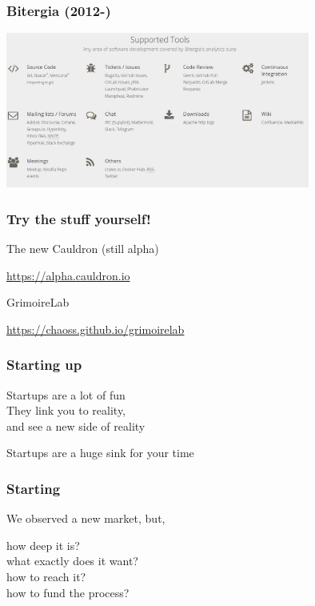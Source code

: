 \documentclass[17pt,aspectratio=169,hyperref=pdfusetitle]{beamer}
\begin{document}
\begin{frame}[fragile]
  \frametitle{Bitergia (2012-)}

  \begin{center}
  \includegraphics[width=10cm]{figs/bitergia-tools}
  \end{center}  
  
\end{frame}

\begin{frame}[fragile]
  \frametitle{Try the stuff yourself!}

  The new Cauldron (still alpha)

  \begin{flushright}
    \url{https://alpha.cauldron.io}
  \end{flushright}

  GrimoireLab

  \begin{flushright}
    \url{https://chaoss.github.io/grimoirelab}
  \end{flushright}
  

\end{frame}

\begin{frame}[fragile]
  \frametitle{Starting up}

  Startups are a lot of fun \\
  They link you to reality, \\
  and see a new side of reality \\
  
  \begin{center}
    Startups are a huge sink for your time
  \end{center}  
  
\end{frame}

\begin{frame}[fragile]
  \frametitle{Starting}

  We observed a new market, but,

  \begin{flushright}
  how deep it is? \\
  what exactly does it want? \\
  how to reach it? \\
  how to fund the process? \\
  \end{flushright}
  
\end{frame}
\end{document}
